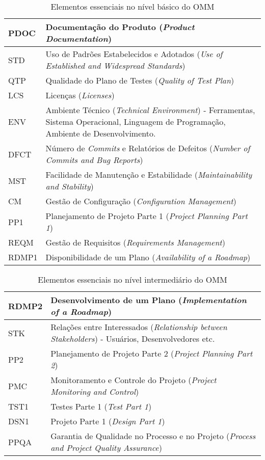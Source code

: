 \begin{table}
  \centering
  \begin{tabular}{|p{2cm}|p{13cm}|}
    \hline
    PDOC & Documentação do Produto (\emph{Product Documentation}) \\
    \hline
    STD & Uso de Padrões Estabelecidos e Adotados (\emph{Use of
      Established and Widespread Standards}) \\
    \hline
    QTP & Qualidade do Plano de Testes (\emph{Quality of Test Plan})
    \\
    \hline
    LCS & Licenças (\emph{Licenses}) \\
    \hline
    ENV & Ambiente Técnico (\emph{Technical Environment}) -
    Ferramentas, Sistema Operacional, Linguagem de Programação,
    Ambiente de Desenvolvimento. \\
    \hline
    DFCT & Número de \emph{Commits} e Relatórios de Defeitos
    (\textit{Number of Commits and Bug Reports}) \\
    \hline
    MST & Facilidade de Manutenção e Estabilidade
    (\emph{Maintainability and Stability}) \\
    \hline
    CM & Gestão de Configuração
    (\emph{Configuration Management}) \\
    \hline
    PP1 & Planejamento de Projeto Parte 1
    (\emph{Project Planning Part 1}) \\
    \hline
    REQM & Gestão de Requisitos
    (\emph{Requirements Management}) \\
    \hline
    RDMP1 & Disponibilidade de um Plano
    (\emph{Availability of a Roadmap}) \\
    \hline
  \end{tabular}
  \caption{Elementos essenciais no nível básico do OMM}
  \label{tab:omm-basic}
\end{table}

\begin{table}
  \centering
  \begin{tabular}{|p{2cm}|p{13cm}|}
    \hline
    RDMP2 & Desenvolvimento de um Plano
    (\textit{Implementation of a Roadmap}) \\
    \hline
    STK & Relações entre Interessados
    (\textit{Relationship between Stakeholders}) - Usuários,
    Desenvolvedores etc. \\
    \hline
    PP2 & Planejamento de Projeto Parte 2
    (\textit{Project Planning Part 2}) \\
    \hline
    PMC & Monitoramento e Controle do Projeto
    (\textit{Project Monitoring and Control}) \\
    \hline
    TST1 & Testes Parte 1
    (\textit{Test Part 1}) \\
    \hline
    DSN1 & Projeto Parte 1
    (\textit{Design Part 1}) \\
    \hline
    PPQA & Garantia de Qualidade no Processo e no Projeto
    (\textit{Process and Project Quality Assurance}) \\
    \hline
  \end{tabular}
  \caption{Elementos essenciais no nível intermediário do OMM}
  \label{tab:omm-intermediate}
\end{table}

